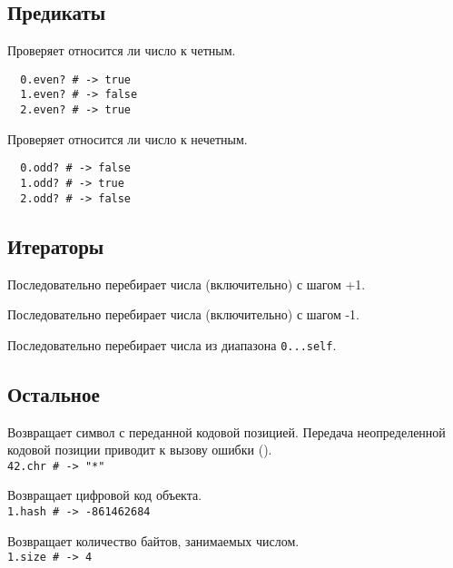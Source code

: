 \subsection*{Предикаты}

\begin{methodlist}
  Проверяет относится ли число к четным.
  \begin{verbatim}
  0.even? # -> true
  1.even? # -> false
  2.even? # -> true
  \end{verbatim}

  Проверяет относится ли число к нечетным.
  \begin{verbatim}
  0.odd? # -> false
  1.odd? # -> true
  2.odd? # -> false
  \end{verbatim}
\end{methodlist}

\subsection*{Итераторы}

\begin{methodlist}
  Последовательно перебирает числа (включительно) с шагом +1. 

  Последовательно перебирает числа (включительно) с шагом -1. 

  Последовательно перебирает числа из диапазона \verb!0...self!.
\end{methodlist}

\subsection*{Остальное}

\begin{methodlist}
  Возвращает символ с переданной кодовой позицией. Передача неопределенной кодовой позиции приводит к вызову ошибки ().
  \\\verb!42.chr # -> "*"!

  Возвращает цифровой код объекта.
  \\\verb!1.hash # -> -861462684!

  Возвращает количество байтов, занимаемых числом.
  \\\verb!1.size # -> 4!
\end{methodlist}

